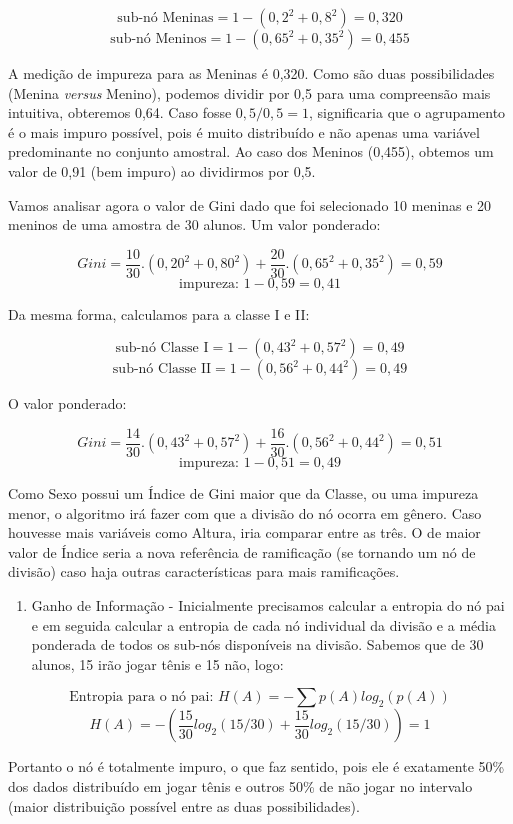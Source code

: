 \documentclass[
]{book}
\providecommand{\tightlist}{%
  \setlength{\itemsep}{0pt}\setlength{\parskip}{0pt}}
\begin{document}
\[\mbox{sub-nó Meninas}= 1 -(0,2^2+0,8^2)=0,320\]
\[\mbox{sub-nó Meninos}= 1 -(0,65^2+0,35^2)=0,455\]

A medição de impureza para as Meninas é 0,320. Como são duas possibilidades (Menina \emph{versus} Menino), podemos dividir por 0,5 para uma compreensão mais intuitiva, obteremos 0,64. Caso fosse \(0,5 / 0,5 = 1\), significaria que o agrupamento é o mais impuro possível, pois é muito distribuído e não apenas uma variável predominante no conjunto amostral. Ao caso dos Meninos (0,455), obtemos um valor de 0,91 (bem impuro) ao dividirmos por 0,5.

Vamos analisar agora o valor de Gini dado que foi selecionado 10 meninas e 20 meninos de uma amostra de 30 alunos. Um valor ponderado:

\[Gini=\frac{10}{30}.(0,20^2+0,80^2)+\frac{20}{30}.(0,65^2+0,35^2)=0,59\]
\[\mbox{impureza: }1-0,59=0,41\]

Da mesma forma, calculamos para a classe I e II:

\[\mbox{sub-nó Classe I}= 1 -(0,43^2+0,57^2)=0,49\]
\[\mbox{sub-nó Classe II}= 1 -(0,56^2+0,44^2)=0,49\]

O valor ponderado:

\[Gini=\frac{14}{30}.(0,43^2+0,57^2)+\frac{16}{30}.(0,56^2+0,44^2)=0,51\]
\[\mbox{impureza: }1-0,51=0,49\]

Como Sexo possui um Índice de Gini maior que da Classe, ou uma impureza menor, o algoritmo irá fazer com que a divisão do nó ocorra em gênero. Caso houvesse mais variáveis como Altura, iria comparar entre as três. O de maior valor de Índice seria a nova referência de ramificação (se tornando um nó de divisão) caso haja outras características para mais ramificações.

\begin{enumerate}
\def\labelenumi{\arabic{enumi}.}
\setcounter{enumi}{1}
\tightlist
\item
  Ganho de Informação - Inicialmente precisamos calcular a entropia do nó pai e em seguida calcular a entropia de cada nó individual da divisão e a média ponderada de todos os sub-nós disponíveis na divisão. Sabemos que de 30 alunos, 15 irão jogar tênis e 15 não, logo:
\end{enumerate}

\[\mbox{Entropia para o nó pai: } H(A)=- \sum p(A)log_2(p(A))\]
\[H(A)=-(\frac{15}{30}log_2(15/30)+\frac{15}{30}log_2(15/30))=1\]

Portanto o nó é totalmente impuro, o que faz sentido, pois ele é exatamente 50\% dos dados distribuído em jogar tênis e outros 50\% de não jogar no intervalo (maior distribuição possível entre as duas possibilidades).
\end{document}
